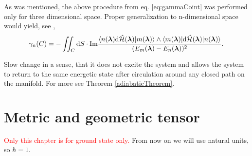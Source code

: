 As was mentioned, the above procedure from eq. \ref{eq:gammaCoint} was performed only for three dimensional space. Proper generalization to n-dimensional space would yield, see \citep{berry1984},
\begin{equation}
    \gamma_n(C) = -\iint_C \mathrm{d} S \cdot\textrm{Im} \frac{
            \braket{n({\bm\lambda})\mathrm{d} \hat{\mathcal{H}}({\bm\lambda}) |m({\bm\lambda})}\wedge \braket{m({\bm\lambda})|\mathrm{d}\hat{\mathcal{H}}({\bm\lambda})|n({\bm\lambda})}    
             }{
(E_m({\bm\lambda})-E_n({\bm\lambda}))^2
             }.
\end{equation}




\begin{definition}[Adibaticity]
    Slow change in a sense, that it does not excite the system and allows the system to return to the same energetic state after circulation around any closed path on the manifold. For more see Theorem \ref{adiabaticTheorem}.
\end{definition}




\section{Metric and geometric tensor}
\textcolor{red}{Only this chapter is for ground state only.}
From now on we will use natural units, so $\hbar=1$.

